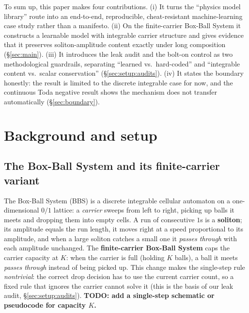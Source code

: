 \documentclass[11pt]{article}
\theoremstyle{definition}
\theoremstyle{plain}
\begin{document}
To sum up, this paper makes four contributions. (i) It turns the ``physics model library'' route
into an end-to-end, reproducible, cheat-resistant machine-learning case study rather than a
manifesto. (ii) On the finite-carrier Box-Ball System it constructs a learnable model with
integrable carrier structure and gives evidence that it preserves soliton-amplitude content
exactly under long composition (\S\ref{sec:main}). (iii) It introduces the leak audit and the
bolt-on control as two methodological guardrails, separating ``learned vs.\ hard-coded'' and
``integrable content vs.\ scalar conservation'' (\S\ref{sec:setup:audits}). (iv) It states the
boundary honestly: the result is limited to the discrete integrable case for now, and the
continuous Toda negative result shows the mechanism does not transfer automatically
(\S\ref{sec:boundary}).

\section{Background and setup}\label{sec:setup}

\subsection{The Box-Ball System and its finite-carrier variant}\label{sec:setup:bbs}
The Box-Ball System (BBS) is a discrete integrable cellular automaton on a one-dimensional
$0/1$ lattice: a \emph{carrier} sweeps from left to right, picking up balls it meets and
dropping them into empty cells. A run of consecutive $1$s is a \textbf{soliton}; its amplitude
equals the run length, it moves right at a speed proportional to its amplitude, and when a large
soliton catches a small one it \emph{passes through} with each amplitude unchanged. The
\textbf{finite-carrier Box-Ball System} caps the carrier capacity at $K$: when the carrier is
full (holding $K$ balls), a ball it meets \emph{passes through} instead of being picked up. This
change makes the single-step rule \emph{nontrivial}: the correct drop decision has to use the
current carrier count, so a fixed rule that ignores the carrier cannot solve it (this is the basis
of our leak audit, \S\ref{sec:setup:audits}).
\textbf{TODO: add a single-step schematic or pseudocode for capacity $K$.}
\end{document}
